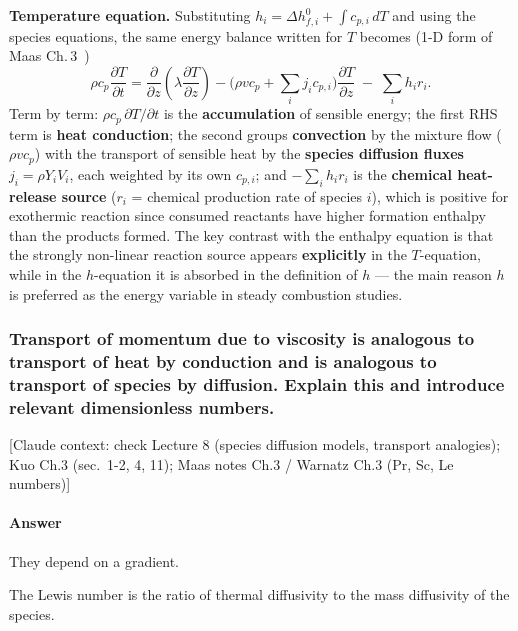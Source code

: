 {\textbf{Temperature equation.} Substituting $h_i = \Delta h_{f,i}^0 + \int c_{p,i}\,dT$ and using the species equations, the same energy balance written for $T$ becomes (1-D form of Maas Ch.\,3~\cite{maas_combustion_lecture})
\begin{equation*}
\rho c_p \frac{\partial T}{\partial t} = \frac{\partial}{\partial z}\!\left(\lambda \frac{\partial T}{\partial z}\right) - \Big(\rho v c_p + \sum_i j_i c_{p,i}\Big)\frac{\partial T}{\partial z} \;-\; \sum_i h_i r_i .
\end{equation*}
Term by term: $\rho c_p\, \partial T/\partial t$ is the \textbf{accumulation} of sensible energy; the first RHS term is \textbf{heat conduction}; the second groups \textbf{convection} by the mixture flow ($\rho v c_p$) with the transport of sensible heat by the \textbf{species diffusion fluxes} $j_i = \rho Y_i V_i$, each weighted by its own $c_{p,i}$; and $-\sum_i h_i r_i$ is the \textbf{chemical heat-release source} ($r_i$ = chemical production rate of species $i$), which is positive for exothermic reaction since consumed reactants have higher formation enthalpy than the products formed. The key contrast with the enthalpy equation is that the strongly non-linear reaction source appears \textbf{explicitly} in the $T$-equation, while in the $h$-equation it is absorbed in the definition of $h$ --- the main reason $h$ is preferred as the energy variable in steady combustion studies.
}


\subsubsection{Transport of momentum due to viscosity is analogous to transport of heat by conduction and is analogous to transport of species by diffusion. Explain this and introduce relevant dimensionless numbers.}

{\color{gray}\footnotesize [Claude context: check Lecture 8 (species diffusion models, transport analogies); Kuo Ch.3 (sec.\ 1-2, 4, 11); Maas notes Ch.3 / Warnatz Ch.3 (Pr, Sc, Le numbers)]}

\paragraph{Answer}


They depend on a gradient.

The Lewis number is the ratio of thermal diffusivity to the mass diffusivity of the species.



